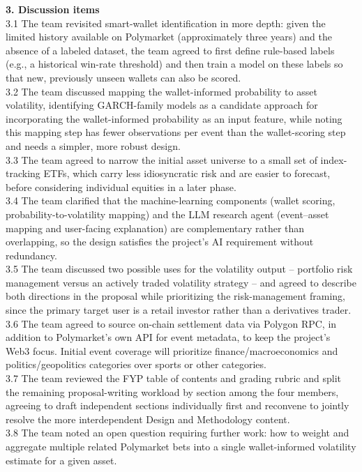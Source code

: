 \textbf{3. Discussion items} \\
3.1 The team revisited smart-wallet identification in more depth: given the limited history available on Polymarket (approximately three years) and the absence of a labeled dataset, the team agreed to first define rule-based labels (e.g., a historical win-rate threshold) and then train a model on these labels so that new, previously unseen wallets can also be scored. \\
3.2 The team discussed mapping the wallet-informed probability to asset volatility, identifying GARCH-family models as a candidate approach for incorporating the wallet-informed probability as an input feature, while noting this mapping step has fewer observations per event than the wallet-scoring step and needs a simpler, more robust design. \\
3.3 The team agreed to narrow the initial asset universe to a small set of index-tracking ETFs, which carry less idiosyncratic risk and are easier to forecast, before considering individual equities in a later phase. \\
3.4 The team clarified that the machine-learning components (wallet scoring, probability-to-volatility mapping) and the LLM research agent (event--asset mapping and user-facing explanation) are complementary rather than overlapping, so the design satisfies the project's AI requirement without redundancy. \\
3.5 The team discussed two possible uses for the volatility output -- portfolio risk management versus an actively traded volatility strategy -- and agreed to describe both directions in the proposal while prioritizing the risk-management framing, since the primary target user is a retail investor rather than a derivatives trader. \\
3.6 The team agreed to source on-chain settlement data via Polygon RPC, in addition to Polymarket's own API for event metadata, to keep the project's Web3 focus. Initial event coverage will prioritize finance/macroeconomics and politics/geopolitics categories over sports or other categories. \\
3.7 The team reviewed the FYP table of contents and grading rubric and split the remaining proposal-writing workload by section among the four members, agreeing to draft independent sections individually first and reconvene to jointly resolve the more interdependent Design and Methodology content. \\
3.8 The team noted an open question requiring further work: how to weight and aggregate multiple related Polymarket bets into a single wallet-informed volatility estimate for a given asset.


